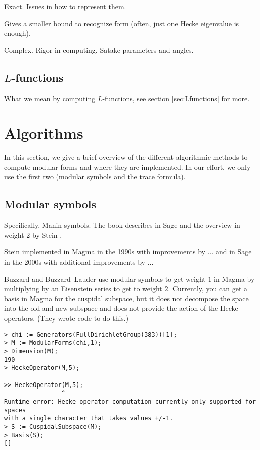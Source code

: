\documentclass[11pt]{amsart}
\numberwithin{equation}{subsection}
\theoremstyle{plain}
\theoremstyle{definition}
\begin{document}
Exact.  Issues in how to represent them.

Gives a smaller bound to recognize form (often, just one Hecke eigenvalue is enough).

Complex.  Rigor in computing.  Satake parameters and angles.

\subsection{$L$-functions}

What we mean by computing $L$-functions, see section \ref{sec:Lfunctions} for more.

\section{Algorithms} \label{sec:algs}

In this section, we give a brief overview of the different algorithmic methods to compute modular forms and where they are implemented.  In our effort, we only use the first two (modular symbols and the trace formula).  

\subsection{Modular symbols}

Specifically, Manin symbols.  The book \cite{Stein} describes in Sage and the overview in weight 2 by Stein \cite{Stein2}.

Stein implemented in Magma in the 1990s with improvements by ...  and in Sage in the 2000s with additional improvements by ...

Buzzard and Buzzard--Lauder use modular symbols to get weight $1$ in Magma by multiplying by an Eisenstein series to get to weight $2$.  Currently, you can get a basis in Magma for the cuspidal subspace, but it does not decompose the space into the old and new subspace and does not provide the action of the Hecke operators.  (They wrote code to do this.)  

\begin{verbatim}
> chi := Generators(FullDirichletGroup(383))[1];
> M := ModularForms(chi,1);
> Dimension(M);
190
> HeckeOperator(M,5);

>> HeckeOperator(M,5);
                ^
Runtime error: Hecke operator computation currently only supported for spaces 
with a single character that takes values +/-1.
> S := CuspidalSubspace(M);
> Basis(S);
[]
\end{verbatim}
\end{document}
